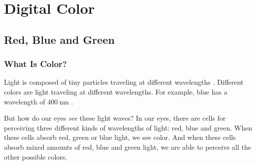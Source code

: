 \begin{comment}
  
\end{comment}


\chapter{Digital Color}
\label{cha:color}

\cite{niederst1999webdesign}







\cite{Cotton95colour}

\section{Red, Blue and Green}
\label{sec:color-models}


\subsection{What Is Color?}
\label{sec:what-color}

\newcommand{\bluewave}{\ensuremath{\SI{400}{\nano\meter}}}

Light is composed of tiny particles traveling at different
wavelengths \cite{neider93:_openg_progr_guide}.
Different colors are light traveling at different wavelengths. For
example, blue has a wavelength of \bluewave
\cite{ohlsson99:_digit_bild_kreat}.

But how do our eyes \textit{see} these light waves? In our eyes,
there are cells for perceiving three different kinds of wavelengths
of light: red, blue and green. When these cells absorb red, green or
blue light, we see color. And when these cells absorb mixed amounts
of red, blue and green light, we are able to perceive all the other
possible colors.


